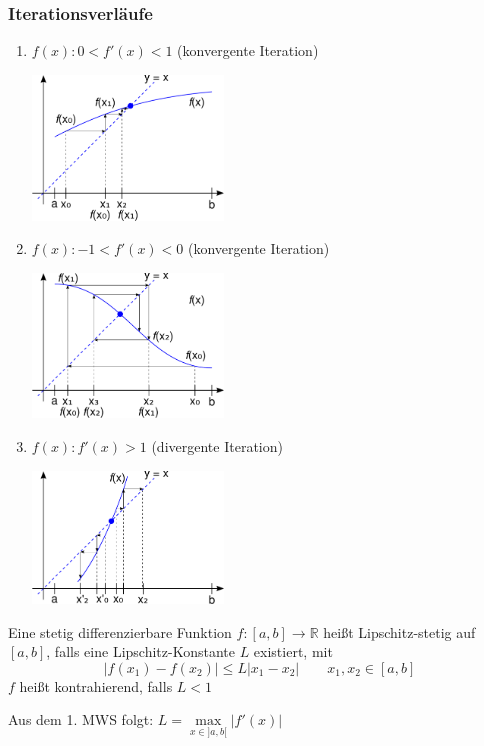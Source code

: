 \subsubsection{Iterationsverläufe}
\begin{enumerate}
	\item $f(x) : 0 < f'(x) < 1$ (konvergente Iteration)
	\begin{center}
		\includegraphics[width=0.4\textwidth]{include/20091215-1.pdf}
	\end{center}
	\item $f(x) : -1 < f'(x) < 0$ (konvergente Iteration)
	\begin{center}
		\includegraphics[width=0.4\textwidth]{include/20091215-2.pdf}
	\end{center}
	\item $f(x) : f'(x) > 1$ (divergente Iteration)
	\begin{center}
		\includegraphics[width=0.4\textwidth]{include/20091215-3.pdf}
	\end{center}
\end{enumerate}

\begin{definition}
	Eine stetig differenzierbare Funktion $f: [a, b] \rightarrow \mathbb{R}$ heißt Lipschitz-stetig auf $[a, b]$, falls eine Lipschitz-Konstante $L$ existiert, mit
	\begin{equation*}
		|f(x_1) - f(x_2)| \leq L |x_1 - x_2| \qquad x_1, x_2 \in [a, b]
	\end{equation*}
	$f$ heißt kontrahierend, falls $L < 1$
	\begin{note}
		Aus dem 1. MWS folgt: $L = \underset{x \in ]a, b[}{\max} |f'(x)|$
	\end{note}
\end{definition}

